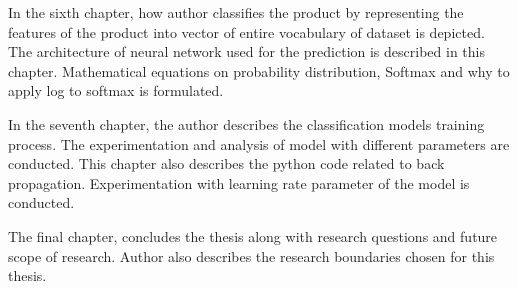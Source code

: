 In the sixth chapter, how author classifies the product by representing the features of the product into vector of entire vocabulary of dataset is depicted. The architecture of neural network used for the prediction is described in this chapter. Mathematical equations on probability distribution, Softmax and why to apply log to softmax is formulated. 

In the seventh chapter, the author describes the classification models training process. The experimentation and analysis of model with different parameters are conducted. This chapter also describes the python code related to back propagation. Experimentation with learning rate parameter of the model is conducted.

The final chapter, concludes the thesis along with research questions and future scope of research. Author also describes the research boundaries chosen for this thesis.  